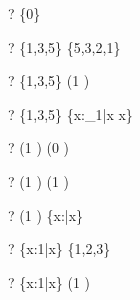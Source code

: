 \documentclass{article}
\begin{document}
\begin{zed} \vdash?  \emptyset \subset \{0\} \end{zed}
\begin{zed} \vdash?  \{1,3,5\} \subset \{5,3,2,1\} \end{zed}
\begin{zed} \vdash?  \{1,3,5\} \subset (1 ) \end{zed}
\begin{zed} \vdash?  \{1,3,5\} \subset \{x:\nat_1|x \land x\} \end{zed}
\begin{zed} \vdash?  (1 ) \subset (0 ) \end{zed}
\begin{zed} \vdash?  (1 ) \subset (1 ) \end{zed}
\begin{zed} \vdash?  (1 ) \subset \{x:\nat|x\} \end{zed}
\begin{zed} \vdash?  \{x:1|x\} \subset \{1,2,3\} \end{zed}
\begin{zed} \vdash?  \{x:1|x\} \subset (1 ) \end{zed}
\end{document}
